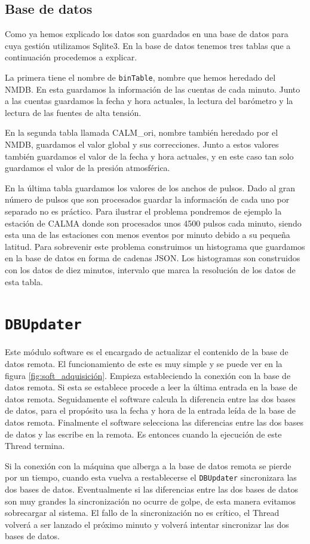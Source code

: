 	\subsection{Base de datos}
		Como ya hemos explicado los datos son guardados en una base de datos para cuya gestión utilizamos Sqlite3. En la base de datos tenemos
		tres tablas que a continuación procedemos a explicar.
	    	\par
		La primera tiene el nombre de \texttt{binTable}, nombre que hemos heredado del NMDB. En esta guardamos la información de las cuentas
		de cada minuto. Junto a las cuentas guardamos la fecha y hora actuales, la lectura del barómetro y la lectura de las fuentes de alta
		tensión.
	    	\par 
		En la segunda tabla llamada CALM\_ori, nombre también heredado por el NMDB, guardamos el valor global y sus correcciones. Junto a
		estos valores también guardamos el valor de la fecha y hora actuales, y en este caso tan solo guardamos el valor de la presión
		atmosférica.
	    	\par
		En la última tabla guardamos los valores de los anchos de pulsos. Dado al gran número de pulsos que son procesados guardar la
		información de cada uno por separado no es práctico. Para ilustrar el problema pondremos de ejemplo la estación de CALMA donde son
		procesados unos 4500 pulsos cada minuto, siendo esta una de las estaciones con menos eventos por minuto debido a su pequeña latitud.
		Para sobrevenir este problema construimos un histograma que guardamos en la base de datos en forma de cadenas JSON\cite{JSON}. Los
		histogramas son construidos con los datos de diez minutos, intervalo que marca la resolución de los datos de esta tabla.

\section{\texttt{DBUpdater}}
	Este módulo software es el encargado de actualizar el contenido de la base de datos remota. El funcionamiento de este es muy simple y se puede
	ver en la figura \ref{fig:soft_adquisición}. Empieza estableciendo la conexión con la base de datos remota. Si esta se establece procede a leer la
	última entrada en la base de datos remota. Seguidamente el software calcula la diferencia entre las dos bases de datos, para el propósito usa
	la fecha y hora de la entrada leída de la base de datos remota. Finalmente el software selecciona las diferencias entre las dos bases de datos
	y las escribe en la remota. Es entonces cuando la ejecución de este Thread termina. 
	\par
	Si la conexión con la máquina que alberga a la base de datos remota se pierde por un tiempo, cuando esta vuelva a restablecerse el
	\texttt{DBUpdater} sincronizara las dos bases de datos. Eventualmente si las diferencias entre las dos bases de datos son muy grandes la
	sincronización no ocurre de golpe, de esta manera evitamos sobrecargar al sistema. El fallo de la sincronización no es crítico, el Thread
	volverá a ser lanzado el próximo minuto y volverá intentar sincronizar las dos bases de datos.

